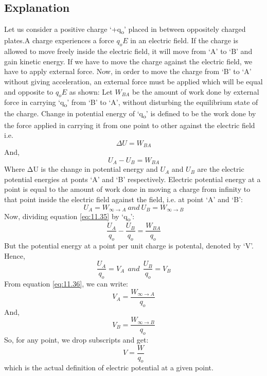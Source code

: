 \subsection*{Explanation}
Let us consider a positive charge ‘+q\textsubscript{o}’ placed in between
oppositely charged plates.A charge experiences a force $q_{o}E$ in an
electric field. If the charge is allowed to move freely inside the electric field,
it will move from ‘A’ to ‘B’ and gain kinetic energy. If we have to move the
charge against the electric field, we have to apply external force. Now,
in order to move the charge from ‘B’ to ‘A’ without giving acceleration,
an external force must be applied which will be equal and opposite to $q_{o}E$
as shown:
Let $W_{BA}$ be the amount of work done by external force in carrying ‘q\textsubscript{o}’
from ‘B’ to ‘A’, without disturbing the equilibrium state of the charge.
Change in potential energy of ‘q\textsubscript{o}’ is defined to be the work
done by the force applied in carrying it from one point to other against the
electric field i.e.
\begin{equation}
  \Delta U = W_{BA} \nonumber
\end{equation}
And,
\begin{equation}\label{eq:11.35}
   U_{A} - U_{B} = W_{BA} 
\end{equation}
Where ΔU is the change in potential energy and $U_{A}$ and $U_{B}$ are the
electric potential energies at ponts ‘A’ and ‘B’ respectively. Electric potential
energy at a point is equal to the amount of work done in moving a charge from
infinity to that point inside the electric field against the field, i.e.
at point ‘A’ and ‘B’:
\begin{equation}\label{eq:11.36}
  U_{A} = W_{\infty\rightarrow A}\:and\:U_{B} = W_{\infty\rightarrow B}
\end{equation}
Now, dividing equation \ref{eq:11.35} by ‘q\textsubscript{o}’:
\begin{equation}\label{eq:11.37}
  \frac{U_{A}}{q_{o}} - \frac{U_{B}}{q_{o}} = \frac{W_{BA}}{q_{o}}
\end{equation}
But the potential energy at a point per unit charge is potental, denoted by ‘V’. Hence,
\begin{equation}\label{eq:11.38}
  \frac{U_{A}}{q_{o}} = V_{A} \:\: and \:\: \frac{U_{B}}{q_{o}} = V_{B} 
\end{equation}
From equation \ref{eq:11.36}, we can write:
\begin{equation}\label{eq:11.37}
  V_{A} =\frac{W_{\infty\rightarrow A}}{q_{o}}
\end{equation}
And,
\begin{equation}\label{eq:11.40}
  V_{B} = \frac{W_{\infty\rightarrow B}}{q_{o}}
\end{equation}
So, for any point, we drop subscripts and get:
\begin{equation}\label{eq:11.41}
  V = \frac{W}{q_{o}}
\end{equation}
which is the actual  definition of electric potential at a given point.

